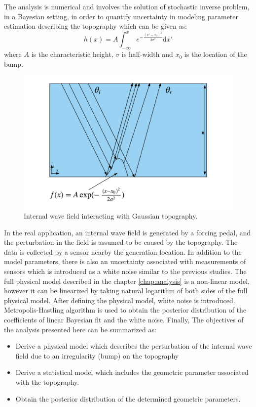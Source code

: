 \documentclass[12pt]{report}
\begin{document}
The analysis is numerical and involves the solution of stochastic inverse problem, in a Bayesian setting, in order to quantify uncertainty in modeling parameter estimation describing the topography which can be given as:
\begin{equation}
h(x)=A \int_{-\infty}^{x} e^{-\frac{(x'-x_0)^2}{2\sigma^2}} \mathrm{d}x'
\end{equation}
where $A$ is the characteristic height, $\sigma$ is half-width and $x_0$ is the location of the bump.
\begin{figure}[!h]
 \label{fig:1}
  \centering
      \includegraphics[scale=0.2]{TopoDetect.png}
      \caption{Internal wave field interacting with Gaussian topography.}
\end{figure}
In the real application, an internal wave field is generated by a forcing pedal\cite{Allshouse}, and the perturbation in the field is assumed to be caused by the topography. The data is collected by a sensor nearby the generation location. In addition to the model parameters, there is also an uncertainty associated with measurements of sensors which is introduced as a white noise similar to the previous studies\cite{Lin2017,Earls2013,Reed2015}. The full physical model described in the chapter \ref{chap:analysis} is a non-linear model, however it can be linearized by taking natural logarithm of both sides of the full physical model. After defining the physical model, white noise is introduced. Metropolis-Hastling algorithm\cite{Solonen2006} is used to obtain the posterior distribution of the coefficients of linear Bayesian fit and the white noise. Finally, The objectives of the analysis presented here can be summarized as: 
\begin{itemize}
   \item Derive a physical model which describes the perturbation of the internal wave field due to an irregularity (bump) on the topography
   \item  Derive a statistical model which includes the geometric parameter associated with the topography.
   \item  Obtain the posterior distribution of the determined geometric parameters.
   \end{itemize}
   
\end{document}
